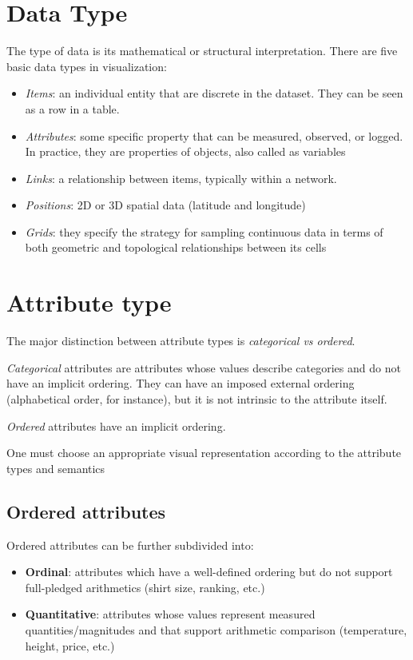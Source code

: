 \section{Data Type}
The type of data is its mathematical or structural interpretation. 
There are five basic data types in visualization:
\begin{itemize}[noitemsep]
    \item \emph{Items}: an individual entity that are discrete in the dataset. They can be seen as a row in a table. 
    \item \emph{Attributes}: some specific property that can be measured, observed, or logged. In practice, they are properties of objects, also called as variables
    \item \emph{Links}: a relationship between items, typically within a network.
    \item \emph{Positions}: 2D or 3D spatial data (latitude and longitude)
    \item \emph{Grids}: they specify the strategy for sampling continuous data in terms of both geometric and topological relationships between its cells
\end{itemize}

\section{Attribute type}
The major distinction between attribute types is \emph{categorical vs ordered}. \par
\emph{Categorical} attributes are attributes whose values describe categories and do not have an implicit ordering. They can have an imposed external ordering (alphabetical order, for instance), but it is not intrinsic to the attribute itself. \par
\emph{Ordered} attributes have an implicit ordering.\par
One must choose an appropriate visual representation according to the attribute types and semantics

\subsection{Ordered attributes}
Ordered attributes can be further subdivided into:
\begin{itemize}[noitemsep]
    \item \textbf{Ordinal}: attributes which have a well-defined ordering but do not support full-pledged arithmetics (shirt size, ranking, etc.)
    \item \textbf{Quantitative}: attributes whose values represent measured quantities/magnitudes and that support arithmetic comparison (temperature, height, price, etc.)
\end{itemize}\par

